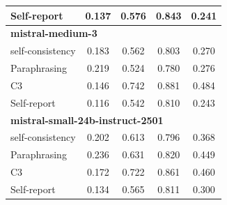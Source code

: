 \documentclass[11pt]{article}
\theoremstyle{plain}
\theoremstyle{definition}
\theoremstyle{remark}
\begin{document}
\begin{table}[p]
\begin{minipage}[t]{0.48\textwidth}
\begin{tabular}{lcccc}
        Self-report      & 0.137 & 0.576 & 0.843 & 0.241 \\
        \midrule
        \multicolumn{5}{l}{\textbf{mistral-medium-3}} \\
        self-consistency & 0.183 & 0.562 & 0.803 & 0.270 \\
        Paraphrasing     & 0.219 & 0.524 & 0.780 & 0.276 \\
       C3             & 0.146 & 0.742 & 0.881 & 0.484 \\
        Self-report      & 0.116 & 0.542 & 0.810 & 0.243 \\
        \midrule
        \multicolumn{5}{l}{\textbf{mistral-small-24b-instruct-2501}} \\
        self-consistency & 0.202 & 0.613 & 0.796 & 0.368 \\
        Paraphrasing     & 0.236 & 0.631 & 0.820 & 0.449 \\
       C3             & 0.172 & 0.722 & 0.861 & 0.460 \\
        Self-report      & 0.134 & 0.565 & 0.811 & 0.300 \\
        \bottomrule
    \end{tabular}
\end{minipage}
\end{table}
\end{document}
